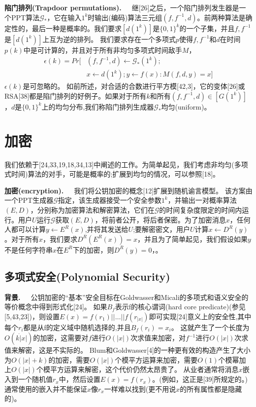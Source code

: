 \documentclass[]{article}
\begin{document}
    
    \textbf{陷门排列(Trapdoor permutations).}\ \ \ 
    继[26]之后，一个陷门排列发生器是一个PPT算法$\mathcal{G}_*$，它在输入$1^k$时输出(编码)算法三元组$(f,f^{-1},d)$。前两种算法是确定性的，最后一种是概率的。我们要求$[d(1^k)]$是$\{0,1\}^k$的一个子集，并且$f,f^{-1}$是$[d(1^k)]$上互为逆的排列。
    我们要求存在一个多项式$p$使得$f, f^{-1}$和$d$在时间$p(k)$中是可计算的，并且对于所有非均匀多项式时间敌手$M$，
    \begin{align}\nonumber
    	\epsilon(k)=Pr[&(f,f^{-1},d)\leftarrow \mathcal{G}_*(1^k);\\
    	               &x\leftarrow d(1^k);y\leftarrow f(x):M(f,d,y)=x]\nonumber
    \end{align}
    $\epsilon(k)$是可忽略的。
    如前所述，对合适的合数进行平方模[42,3]，它的变体[26]或RSA[38]都是陷门排列的好例子。如果对于所有$k$和所有$(f,f^{-1},d) \in [G(1^k)]$，$d$是$\{0,1\}^k$上的均匀分布,我们称陷门排列生成器$\mathcal{G}_*$均匀(uniform)。
    
    \section{加密}
    
    我们依赖于[24,33,19,18,34,13]中阐述的工作。为简单起见，我们考虑非均匀(多项式时间)算法的对手，可能是概率的;扩展到均匀的情况，可以参照[18]。
    
    
    \textbf{加密(encryption).}\ \ \ 
    我们将公钥加密的概念[12]扩展到随机谕言模型。
    该方案由一个PPT生成器$\mathcal{G}$指定，该生成器接受一个安全参数$1^k$，并输出一对概率算法$(E, D)$，分别称为加密算法和解密算法，它们在$\mathcal{G}$的时间复杂度限定的时间内运行。用户$U$运行$\mathcal{G}$获取$(E, D)$，将前者公开，将后者保密。为了加密消息$x$，任何人都可以计算$y\leftarrow E^R(x)$,并将其发送给$U$;要解密密文，用户$U$计算$x\leftarrow D^R(y)$。对于所有$x$，我们要求$D^R(E^R(x))=x$，并且为了简单起见，我们假设如果$y$不是任何字符串$x$在$E^R$下的加密，则$D^R(y) = 0$，。
    
    
    \subsection{多项式安全(Polynomial Security)}
    
    \textbf{背景.}\ \ \ 
    公钥加密的“基本”安全目标在Goldwasser和Micali的多项式和语义安全的等价概念中得到形式化[24]。
    如果$B_f$表示f的核心谓词(hard core predicate)(参见[5,43,23])，则设置$E(x) = f (r_1)|| \ldots || f(r_{|x|})$即可实现[24]意义上的安全性,其中每个$r_i$都是从f的定义域中随机选择的,并且$B_f(r_i)=x_i$。
    这就产生了一个长度为$O(k\dot |x|)$的加密，这需要对$f$进行$O(|x|)$次求值来加密，对$f^{-1}$进行$O(|x|)$次求值来解密，这是不实际的。
    Blum和Goldwasser[4]的一种更有效的构造产生了大小为$O(|x|+k)$的加密，需要$O(|x|)$个模平方运算来加密，需要$O(1)$个模幂加上$O(|x|)$个模平方运算来解密，这个代价仍然太昂贵了。
    从业者通常将消息$x$嵌入到一个随机值$r_x$中，然后设置$E(x) = f(r_x)$。(例如，这正是[39]所规定的。)通常使用的嵌入并不能保证$x$像$r_x$一样难以找到(更不用说$x$的所有属性都是隐藏的)。
    
\end{document}
